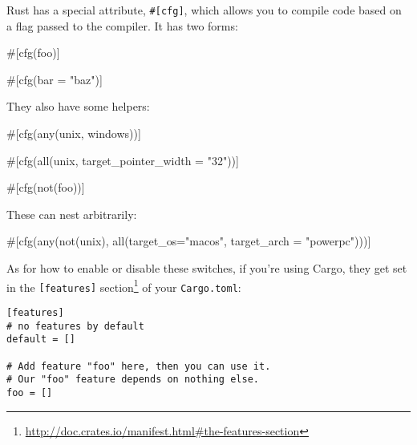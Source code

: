 \documentclass[a4paper,]{book}
\newenvironment{Shaded}{\begin{snugshade}}{\end{snugshade}}
\newcommand{\StringTok}[1]{\textcolor[rgb]{0.31,0.60,0.02}{{#1}}}
\newcommand{\AttributeTok}[1]{\textcolor[rgb]{0.77,0.63,0.00}{{#1}}}
\newcommand{\NormalTok}[1]{{#1}}
\renewcommand{\href}[2]{#2\footnote{\url{#1}}}
\begin{document}
Rust has a special attribute, \texttt{\#{[}cfg{]}}, which allows you to
compile code based on a flag passed to the compiler. It has two forms:

\begin{Shaded}
\begin{Highlighting}[]
\AttributeTok{#[}\NormalTok{cfg}\AttributeTok{(}\NormalTok{foo}\AttributeTok{)]}

\AttributeTok{#[}\NormalTok{cfg}\AttributeTok{(}\NormalTok{bar }\AttributeTok{=} \StringTok{"baz"}\AttributeTok{)]}
\end{Highlighting}
\end{Shaded}

They also have some helpers:

\begin{Shaded}
\begin{Highlighting}[]
\AttributeTok{#[}\NormalTok{cfg}\AttributeTok{(}\NormalTok{any}\AttributeTok{(}\NormalTok{unix}\AttributeTok{,} \NormalTok{windows}\AttributeTok{))]}

\AttributeTok{#[}\NormalTok{cfg}\AttributeTok{(}\NormalTok{all}\AttributeTok{(}\NormalTok{unix}\AttributeTok{,} \NormalTok{target_pointer_width }\AttributeTok{=} \StringTok{"32"}\AttributeTok{))]}

\AttributeTok{#[}\NormalTok{cfg}\AttributeTok{(}\NormalTok{not}\AttributeTok{(}\NormalTok{foo}\AttributeTok{))]}
\end{Highlighting}
\end{Shaded}

These can nest arbitrarily:

\begin{Shaded}
\begin{Highlighting}[]
\AttributeTok{#[}\NormalTok{cfg}\AttributeTok{(}\NormalTok{any}\AttributeTok{(}\NormalTok{not}\AttributeTok{(}\NormalTok{unix}\AttributeTok{),} \NormalTok{all}\AttributeTok{(}\NormalTok{target_os}\AttributeTok{=}\StringTok{"macos"}\AttributeTok{,} \NormalTok{target_arch }\AttributeTok{=} \StringTok{"powerpc"}\AttributeTok{)))]}
\end{Highlighting}
\end{Shaded}

As for how to enable or disable these switches, if you're using Cargo,
they get set in the
\href{http://doc.crates.io/manifest.html\#the-features-section}{\texttt{{[}features{]}}
section} of your \texttt{Cargo.toml}:

\begin{verbatim}
[features]
# no features by default
default = []

# Add feature "foo" here, then you can use it. 
# Our "foo" feature depends on nothing else.
foo = []
\end{verbatim}
\end{document}
